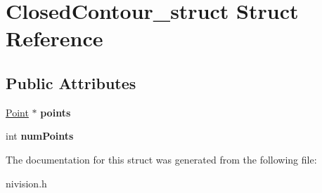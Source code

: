 \hypertarget{structClosedContour__struct}{\section{\-Closed\-Contour\-\_\-struct \-Struct \-Reference}
\label{structClosedContour__struct}
}
\subsection*{\-Public \-Attributes}
\begin{DoxyCompactItemize}
\item 
\hypertarget{structClosedContour__struct_a789c302d8fa7e888eeddf608f8b90677}{\hyperlink{structPoint__struct}{\-Point} $\ast$ {\bfseries points}}\label{structClosedContour__struct_a789c302d8fa7e888eeddf608f8b90677}

\item 
\hypertarget{structClosedContour__struct_a38c4adcbacf2d1dc679d6b5887e1df48}{int {\bfseries num\-Points}}\label{structClosedContour__struct_a38c4adcbacf2d1dc679d6b5887e1df48}

\end{DoxyCompactItemize}


\-The documentation for this struct was generated from the following file\-:\begin{DoxyCompactItemize}
\item 
nivision.\-h\end{DoxyCompactItemize}
